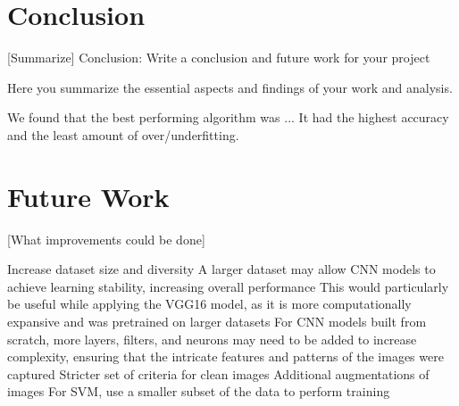 %

\section{Conclusion}
[Summarize]
Conclusion: Write a conclusion and future work for your project

Here you summarize the essential aspects and findings 
of your work and analysis.

We found that the best performing algorithm was ...
It had the highest accuracy and the least amount of over/underfitting.

\section{Future Work}
[What improvements could be done]

Increase dataset size and diversity
A larger dataset may allow CNN models to achieve learning stability, increasing overall performance
This would particularly be useful while applying the VGG16 model, as it is more computationally expansive and was pretrained on larger datasets
For CNN models built from scratch, more layers, filters, and neurons may need to be added to increase complexity, ensuring that the intricate features and patterns of the images were captured
Stricter set of criteria for clean images
Additional augmentations of images
For SVM, use a smaller subset of the data to perform training
